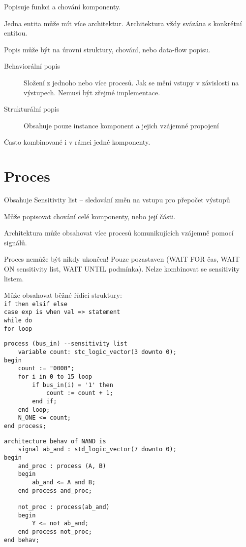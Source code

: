 \documentclass[a4paper, 11pt]{report}
\begin{document}
Popisuje funkci a chování komponenty.

Jedna entita může mít více architektur. Architektura vždy svázána s konkrétní entitou.

Popis může být na úrovni struktury, chování, nebo data-flow popisu.

\begin{description}
	\item[Behaviorální popis] Složení z jednoho nebo více procesů. Jak se mění vstupy v závislosti na výstupech. Nemusí být zřejmé implementace.
	\item[Strukturální popis] Obsahuje pouze instance komponent a jejich vzájemné propojení
\end{description}

Často kombinované i v rámci jedné komponenty.

\section{Proces}

Obsahuje Sensitivity list -- sledování změn na vstupu pro přepočet výstupů

Může popisovat chování celé komponenty, nebo její části.

Architektura může obsahovat více procesů komunikujících vzájemně pomocí signálů.

Proces nemůže být nikdy ukončen! Pouze pozastaven (WAIT FOR čas, WAIT ON sensitivity list, WAIT UNTIL podmínka). Nelze kombinovat se sensitivity listem.

Může obsahovat běžné řídící struktury:\\
\verb|if then elsif else|\\
\verb|case exp is when val => statement|\\
\verb|while do| \\
\verb|for loop| \\

\lstset{caption=Jednoduchý příklad procesu}
\begin{lstlisting}
process (bus_in) --sensitivity list
	variable count: stc_logic_vector(3 downto 0);
begin
	count := "0000";
	for i in 0 to 15 loop
		if bus_in(i) = '1' then
			count := count + 1;
		end if;
	end loop;
	N_ONE <= count;
end process;
\end{lstlisting}

\begin{lstlisting}
architecture behav of NAND is
	signal ab_and : std_logic_vector(7 downto 0);
begin
	and_proc : process (A, B)
	begin
		ab_and <= A and B;
	end process and_proc;
	
	not_proc : process(ab_and)
	begin
		Y <= not ab_and;
	end process not_proc;
end behav;
\end{lstlisting}
\end{document}
